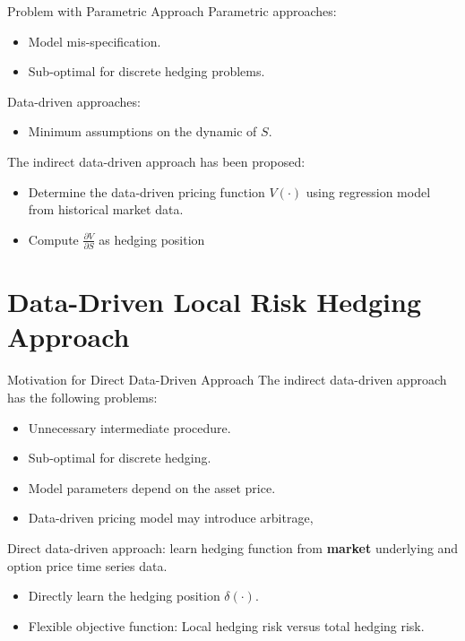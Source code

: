 \documentclass[10pt,table,mathserif]{beamer}
\begin{document}
\begin{frame}{Problem with Parametric Approach}
Parametric approaches:
\begin{itemize}
	\item Model mis-specification.
	\item Sub-optimal for discrete hedging problems.
\end{itemize}

Data-driven approaches:
\begin{itemize}
	\item Minimum assumptions on the dynamic of $S$.
\end{itemize}

The indirect data-driven approach has been proposed:
\begin{itemize}
	\item Determine the data-driven pricing function $V(\cdot)$ using regression model from historical market data.
	\item Compute $\frac{ \partial V}{ \partial S}$ as hedging position
\end{itemize}
\end{frame}


\section{Data-Driven Local Risk Hedging Approach}
\begin{frame}{Motivation for Direct Data-Driven Approach}
The indirect data-driven approach has the following problems:
\begin{itemize}
  \item Unnecessary intermediate procedure.
  \item Sub-optimal for discrete hedging.
  \item Model parameters depend on the asset price.
  \item Data-driven pricing model may introduce arbitrage, 
\end{itemize}

Direct data-driven approach: learn hedging function from \textbf{market} underlying and option  price time series data.
\begin{itemize}
  \item Directly learn the hedging position $\delta(\cdot)$.
  \item Flexible objective function: Local hedging risk versus total hedging risk.
\end{itemize}
\end{frame}
\end{document}
